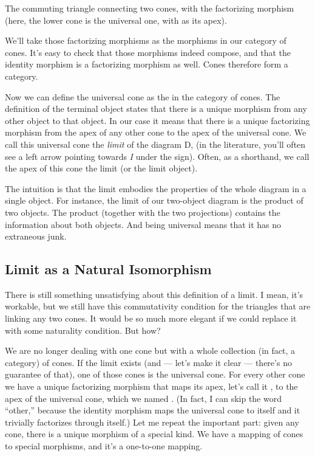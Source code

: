 The commuting triangle connecting two cones, with the factorizing
morphism ~ (here, the lower cone is the universal one, with
 as its apex).

We'll take those factorizing morphisms as the morphisms in our category
of cones. It's easy to check that those morphisms indeed compose, and
that the identity morphism is a factorizing morphism as well. Cones
therefore form a category.

Now we can define the universal cone as the  in
the category of cones. The definition of the terminal object states that
there is a unique morphism from any other object to that object. In our
case it means that there is a unique factorizing morphism from the apex
of any other cone to the apex of the universal cone. We call this
universal cone the \emph{limit} of the diagram D,  (in
the literature, you'll often see a left arrow pointing towards \emph{I}
under the  sign). Often, as a shorthand, we call the apex of
this cone the limit (or the limit object).

The intuition is that the limit embodies the properties of the whole
diagram in a single object. For instance, the limit of our two-object
diagram is the product of two objects. The product (together with the
two projections) contains the information about both objects. And being
universal means that it has no extraneous junk.

\subsection{Limit as a Natural
Isomorphism}\label{limit-as-a-natural-isomorphism}

There is still something unsatisfying about this definition of a limit.
I mean, it's workable, but we still have this commutativity condition
for the triangles that are linking any two cones. It would be so much
more elegant if we could replace it with some naturality condition. But
how?

We are no longer dealing with one cone but with a whole collection (in
fact, a category) of cones. If the limit exists (and --- let's make it
clear --- there's no guarantee of that), one of those cones is the
universal cone. For every other cone we have a unique factorizing
morphism that maps its apex, let's call it , to the apex of
the universal cone, which we named . (In fact, I can skip
the word ``other,'' because the identity morphism maps the universal
cone to itself and it trivially factorizes through itself.) Let me
repeat the important part: given any cone, there is a unique morphism of
a special kind. We have a mapping of cones to special morphisms, and
it's a one-to-one mapping.

